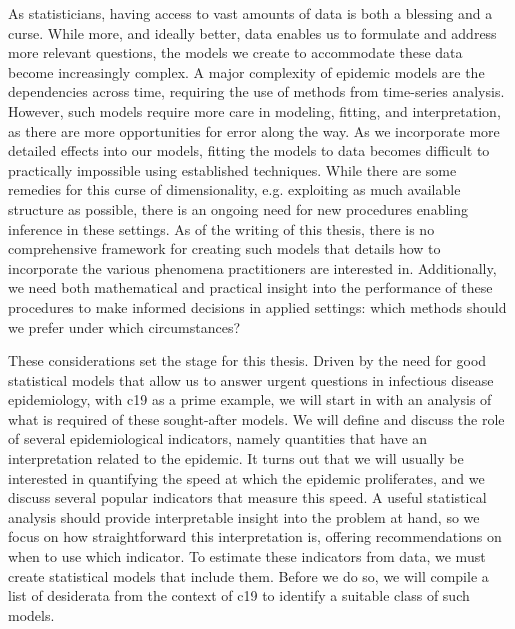 As statisticians, having access to vast amounts of data is both a blessing and a curse. While more, and ideally better, data enables us to formulate and address more relevant questions, the models we create to accommodate these data become increasingly complex. A major complexity of epidemic models are the dependencies across time, requiring the use of methods from time-series analysis. However, such models require more care in modeling, fitting, and interpretation, as there are more opportunities for error along the way. As we incorporate more detailed effects into our models, fitting the models to data becomes difficult to practically impossible using established techniques. While there are some remedies for this curse of dimensionality, e.g. exploiting as much available structure as possible, there is an ongoing need for new procedures enabling inference in these settings. As of the writing of this thesis, there is no comprehensive framework for creating such models that details how to incorporate the various phenomena practitioners are interested in. Additionally, we need both mathematical and practical insight into the performance of these procedures to make informed decisions in applied settings: which methods should we prefer under which circumstances?

These considerations set the stage for this thesis. Driven by the need for good statistical models that allow us to answer urgent questions in infectious disease epidemiology, with \gls{c19} as a prime example, we will start in  with an analysis of what is required of these sought-after models. We will define and discuss the role of several epidemiological indicators, namely quantities that have an interpretation related to the epidemic. It turns out that we will usually be interested in quantifying the speed at which the epidemic proliferates, and we discuss several popular indicators that measure this speed. A useful statistical analysis should provide interpretable insight into the problem at hand, so we focus on how straightforward this interpretation is, offering recommendations on when to use which indicator. To estimate these indicators from data, we must create statistical models that include them. Before we do so, we will compile a list of desiderata from the context of \gls{c19} to identify a suitable class of such models. 

